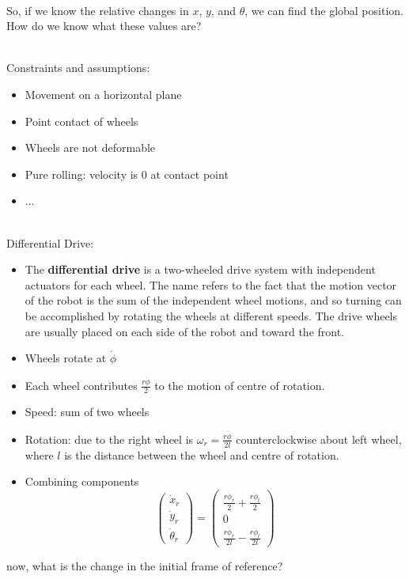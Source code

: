 \documentclass[13pt]{article}
\begin{document}
\hfill \\ \noindent So, if we know the relative changes in $x$, $y$, and $\theta$, we can find the global position. How
do we know what these values are?


\hfill \\
\noindent
Constraints and assumptions:
\begin{itemize}
	\item Movement on a horizontal plane
	\item Point contact of wheels
	\item Wheels are not deformable
	\item Pure rolling: velocity is 0 at contact point
	\item ...
\end{itemize}

\hfill \\
\noindent
Differential Drive:
\begin{itemize}
	\item The \textbf{differential drive} is a two-wheeled drive system with independent actuators for each wheel. The name
		refers to the fact that the motion vector of the robot is the sum of the independent wheel motions, and so
		turning can be accomplished by rotating the wheels at different speeds. The drive
		wheels are usually placed on each side of the robot and toward the front.
	\item Wheels rotate at $\dot \phi$
	\item Each wheel contributes $\frac{r \dot \phi}{2}$ to the motion of centre of rotation.
	\item Speed: sum of two wheels
	\item Rotation: due to the right wheel is $\omega_{r} = \frac{r \dot \phi}{2 l}$ counterclockwise about left wheel,
		where $l$ is the distance between the wheel and centre of rotation.
	\item Combining components
	\begin{equation}
		\begin{pmatrix} \dot x_{r} \\ \dot y_{r} \\ \dot \theta_{r} \end{pmatrix}  = \begin{pmatrix} \frac{r \dot
	\phi_{r}}{2} + \frac{r \dot \phi_{l}}{2} \\ 0 \\ \frac{r\dot \phi_{r}}{2l} - \frac{r\dot \phi_{l}}{2l} \end{pmatrix}
	\end{equation}
\end{itemize}
now, what is the change in the initial frame of reference?
\end{document}
